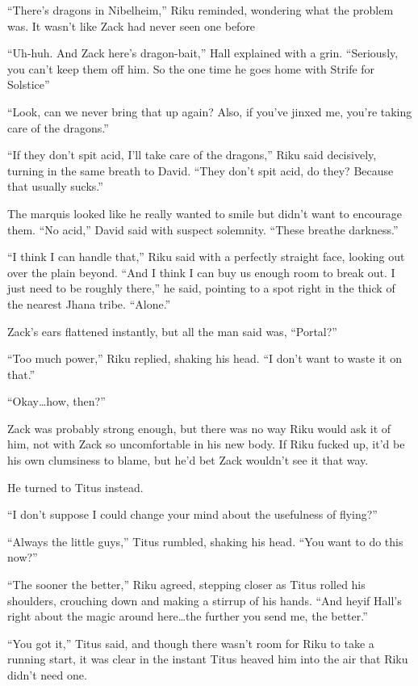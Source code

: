 ``There's dragons in Nibelheim,'' Riku reminded, wondering what the problem was. It wasn't like Zack had never seen one before\textemdash 

``Uh-huh. And Zack here's dragon-bait,'' Hall explained with a grin. ``Seriously, you can't keep them off him. So the one time he goes home with Strife for Solstice\textemdash ''

``Look, can we never bring that up again? Also, if you've jinxed me, you're taking care of the dragons.''

``If they don't spit acid, I'll take care of the dragons,'' Riku said decisively, turning in the same breath to David. ``They don't spit acid, do they? Because that usually sucks.''

The marquis looked like he really wanted to smile but didn't want to encourage them. ``No acid,'' David said with suspect solemnity. ``These breathe darkness.''

``I think I can handle that,'' Riku said with a perfectly straight face, looking out over the plain beyond. ``And I think I can buy us enough room to break out. I just need to be roughly there,'' he said, pointing to a spot right in the thick of the nearest Jhana tribe. ``Alone.''

Zack's ears flattened instantly, but all the man said was, ``Portal?''

``Too much power,'' Riku replied, shaking his head. ``I don't want to waste it on that.''

``Okay\ldots how, then?''

Zack was probably strong enough, but there was no way Riku would ask it of him, not with Zack so uncomfortable in his new body. If Riku fucked up, it'd be his own clumsiness to blame, but he'd bet Zack wouldn't see it that way.

He turned to Titus instead.

``I don't suppose I could change your mind about the usefulness of flying?''

``Always the little guys,'' Titus rumbled, shaking his head. ``You want to do this now?''

``The sooner the better,'' Riku agreed, stepping closer as Titus rolled his shoulders, crouching down and making a stirrup of his hands. ``And hey\textemdash if Hall's right about the magic around here\ldots the further you send me, the better.''

``You got it,'' Titus said, and though there wasn't room for Riku to take a running start, it was clear in the instant Titus heaved him into the air that Riku didn't need one.

